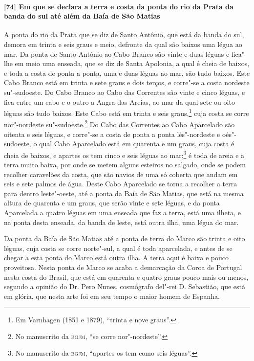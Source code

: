\paragraph{[74] Em que se declara a terra e costa da ponta do rio da Prata da banda do sul
até além da Baía de São Matias} \quad
A ponta do rio da Prata que se diz de Santo Antônio, que está da banda do sul, demora em
trinta e seis graus e meio, defronte da qual são baixos uma légua ao mar. Da ponta de
Santo Antônio ao Cabo Branco são vinte e duas léguas e fica"-lhe em meio uma enseada, que
se diz de Santa Apolonia, a qual é cheia de baixos, e toda a costa de ponta a ponta, uma e
duas léguas ao mar, são tudo baixos. Este Cabo Branco está em trinta e sete graus e dois
terços, e corre"-se a costa nordeste su"-sudoeste. Do Cabo Branco ao Cabo das Correntes são
vinte e cinco léguas, e fica entre um cabo e o outro a Angra das Areias, ao mar da qual
sete ou oito léguas são tudo baixos. Este Cabo está em trinta e seis graus,\footnote{ Em
Varnhagen (1851 e 1879), ``trinta e nove graus''.} cuja costa se corre nor"-nordeste
su"-sudoeste.\footnote{ No manuscrito da \textsc{bgjm}, ``se corre nor"-nordeste''.} Do
Cabo das Correntes ao Cabo Aparcelado são oitenta e seis léguas, e corre"-se a costa de
ponta a ponta lés"-nordeste e oés"-sudoeste, o qual Cabo Aparcelado está em quarenta e um
graus, cuja costa é cheia de baixos, e apartes os tem cinco e seis léguas ao
mar;\footnote{ No manuscrito da \textsc{bgjm}, ``apartes os tem como seis léguas''.} é
toda de areia e a terra muito baixa, por onde se metem alguns esteiros no salgado, onde se
podem recolher caravelões da costa, que são navios de uma só coberta que andam em seis e
sete palmos de água. Deste Cabo Aparcelado se torna a recolher a terra para dentro
leste"-oeste, até a ponta da Baía de São Matias, que está na mesma altura de quarenta e um
graus, que serão vinte e sete léguas, e da ponta Aparcelada a quatro léguas em uma enseada
que faz a terra, está uma ilheta, e na ponta desta enseada, da banda de leste, está outra
ilha, uma légua do mar.

Da ponta da Baía de São Matias até a ponta de terra do Marco são trinta e oito léguas,
cuja costa se corre norte"-sul, a qual é toda aparcelada, e antes de se chegar a esta ponta
do Marco está outra ilha. A terra aqui é baixa e pouco proveitosa. Nesta ponta de Marco se
acaba a demarcação da Coroa de Portugal nesta costa do Brasil, que está em quarenta e
quatro graus pouco mais ou menos, segundo a opinião do Dr. Pero Nunes, cosmógrafo del"-rei
D. Sebastião, que está em glória, que nesta arte foi em seu tempo o maior homem de
Espanha.


